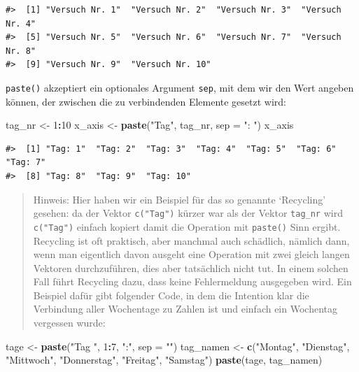 \documentclass[]{book}
\newenvironment{Shaded}{\begin{snugshade}}{\end{snugshade}}
\newcommand{\KeywordTok}[1]{\textcolor[rgb]{0.13,0.29,0.53}{\textbf{#1}}}
\newcommand{\DataTypeTok}[1]{\textcolor[rgb]{0.13,0.29,0.53}{#1}}
\newcommand{\DecValTok}[1]{\textcolor[rgb]{0.00,0.00,0.81}{#1}}
\newcommand{\StringTok}[1]{\textcolor[rgb]{0.31,0.60,0.02}{#1}}
\newcommand{\OperatorTok}[1]{\textcolor[rgb]{0.81,0.36,0.00}{\textbf{#1}}}
\newcommand{\NormalTok}[1]{#1}
\begin{document}
\begin{verbatim}
#>  [1] "Versuch Nr. 1"  "Versuch Nr. 2"  "Versuch Nr. 3"  "Versuch Nr. 4" 
#>  [5] "Versuch Nr. 5"  "Versuch Nr. 6"  "Versuch Nr. 7"  "Versuch Nr. 8" 
#>  [9] "Versuch Nr. 9"  "Versuch Nr. 10"
\end{verbatim}

\texttt{paste()} akzeptiert ein optionales Argument \texttt{sep}, mit
dem wir den Wert angeben können, der zwischen die zu verbindenden
Elemente gesetzt wird:

\begin{Shaded}
\begin{Highlighting}[]
\NormalTok{tag_nr <-}\StringTok{ }\DecValTok{1}\OperatorTok{:}\DecValTok{10}
\NormalTok{x_axis <-}\StringTok{ }\KeywordTok{paste}\NormalTok{(}\StringTok{"Tag"}\NormalTok{, tag_nr, }\DataTypeTok{sep =} \StringTok{": "}\NormalTok{)}
\NormalTok{x_axis}
\end{Highlighting}
\end{Shaded}

\begin{verbatim}
#>  [1] "Tag: 1"  "Tag: 2"  "Tag: 3"  "Tag: 4"  "Tag: 5"  "Tag: 6"  "Tag: 7" 
#>  [8] "Tag: 8"  "Tag: 9"  "Tag: 10"
\end{verbatim}

\begin{quote}
Hinweis: Hier haben wir ein Beispiel für das so genannte `Recycling'
gesehen: da der Vektor \texttt{c("Tag")} kürzer war als der Vektor
\texttt{tag\_nr} wird \texttt{c("Tag")} einfach kopiert damit die
Operation mit \texttt{paste()} Sinn ergibt. Recycling ist oft praktisch,
aber manchmal auch schädlich, nämlich dann, wenn man eigentlich davon
ausgeht eine Operation mit zwei gleich langen Vektoren durchzuführen,
dies aber tatsächlich nicht tut. In einem solchen Fall führt Recycling
dazu, dass keine Fehlermeldung ausgegeben wird. Ein Beispiel dafür gibt
folgender Code, in dem die Intention klar die Verbindung aller
Wochentage zu Zahlen ist und einfach ein Wochentag vergessen wurde:
\end{quote}

\begin{Shaded}
\begin{Highlighting}[]
\NormalTok{tage <-}\StringTok{ }\KeywordTok{paste}\NormalTok{(}\StringTok{"Tag "}\NormalTok{, }\DecValTok{1}\OperatorTok{:}\DecValTok{7}\NormalTok{, }\StringTok{":"}\NormalTok{, }\DataTypeTok{sep =} \StringTok{""}\NormalTok{)}
\NormalTok{tag_namen <-}\StringTok{ }\KeywordTok{c}\NormalTok{(}\StringTok{"Montag"}\NormalTok{, }\StringTok{"Dienstag"}\NormalTok{, }\StringTok{"Mittwoch"}\NormalTok{, }\StringTok{"Donnerstag"}\NormalTok{, }\StringTok{"Freitag"}\NormalTok{, }\StringTok{"Samstag"}\NormalTok{)}
\KeywordTok{paste}\NormalTok{(tage, tag_namen)}
\end{Highlighting}
\end{Shaded}
\end{document}
